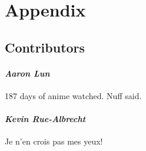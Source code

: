 \documentclass[
]{book}
\begin{document}
\hypertarget{part-appendix}{%
\part{Appendix}\label{part-appendix}}

\hypertarget{contributors}{%
\chapter{Contributors}\label{contributors}}

\hypertarget{aaron-lun}{%
\subsection*{\texorpdfstring{\emph{Aaron Lun}}{Aaron Lun}}\label{aaron-lun}}

187 days of anime watched.
Nuff said.

\hypertarget{kevin-rue-albrecht}{%
\subsection*{\texorpdfstring{\emph{Kevin Rue-Albrecht}}{Kevin Rue-Albrecht}}\label{kevin-rue-albrecht}}

Je n'en crois pas mes yeux!

  
\end{document}
